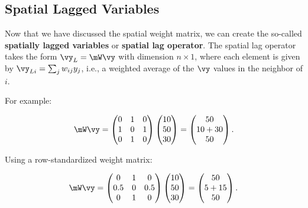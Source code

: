 \subsection{Spatial Lagged Variables}\label{sec:spatial_lag_var}

Now that we have discussed the spatial weight matrix, we can create the so-called \textbf{spatially lagged variables} or \textbf{spatial lag operator}. The spatial lag operator takes the form $\vy_L = \mW\vy$ with dimension $n \times 1$, where each element is given by $\vy_{Li} = \sum_{j}w_{ij}y_j$, i.e., a weighted average of the $\vy$ values in the neighbor of $i$.

For example:

\begin{equation*}
  \mW\vy =    \begin{pmatrix}
     0 & 1 & 0 \\
     1 & 0 & 1 \\
     0 & 1 & 0
  \end{pmatrix}
  \begin{pmatrix}
     10 \\
     50 \\
     30
  \end{pmatrix} =
  \begin{pmatrix}
     50 \\
     10 + 30 \\
     50
  \end{pmatrix}.
\end{equation*}

Using a row-standardized weight matrix:

\begin{equation*}
  \mW\vy =    \begin{pmatrix}
     0 & 1 & 0 \\
     0.5 & 0 & 0.5 \\
     0 & 1 & 0
  \end{pmatrix}
  \begin{pmatrix}
     10 \\
     50 \\
     30
  \end{pmatrix} =
  \begin{pmatrix}
     50 \\
     5 + 15 \\
     50
  \end{pmatrix}.
\end{equation*}

